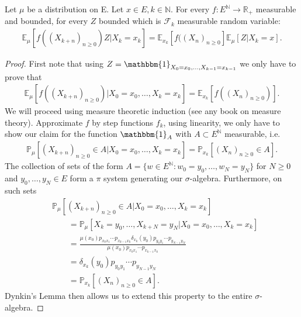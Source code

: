 \begin{theorem}
	Let $\mu$ be a distribution on E. Let $x \in E, k \in \mathbb{N}$. For every $f: E^{\mathbb{N}} \to \mathbb{R}_+$ measurable and bounded, for every $Z$ bounded which is $ \mathcal{F}_k$ measurable random variable:
\begin{align}
	\boxed{	\mathbb{E}_\mu \left[ f((X_{k+n})_{n \geq 0})Z | X_k = x_k \right] = \mathbb{E}_{x_k} \left[ f((X_n)_{n \geq 0} \right] \mathbb{E}_\mu \left[ Z | X_k=x \right] }. 
\end{align}
\end{theorem}
\begin{proof}
	First note that using $Z= \mathbbm{1}_{X_0=x_0, \ldots ,X_{k-1}=x_{k-1}}$ we only have to prove that 
\begin{align}
	\mathbb{E}_{\mu } \left[ f((X_{k+n})_{n\geq 0}) | X_0=x_0 , \ldots , X_k=x_k \right]= \mathbb{E}_{x_k} \left[ f((X_n)_{n\geq 0}) \right]
.\end{align}
	 We will proceed using measure theoretic induction (see any book on measure theory). Approximate $f$ by step functions $f_k$, using linearity, we only have to show our claim for the function $\mathbbm{1}_{A} $ with $A \subset E ^{\mathbb{N}}$ measurable, i.e. 
	\begin{align}
	\mathbb{P}_{\mu } \left[ (X_{k+n})_{n\geq 0}\in A | X_0=x_0, \ldots ,X_k=x_k \right] = \mathbb{P}_{x_k} \left[ (X_n)_{n\geq 0} \in A \right] 
.\end{align}  
The collection of sets of the form $A=\{w \in E^{\mathbb{N}}: w_0=y_0, \ldots ,w_N=y_N\}$ for $N\geq 0$ and $y_0, \ldots ,y_N \in E$ form a $\pi $ system generating our $\sigma$-algebra. Furthermore, on such sets 
\begin{align}
&	\mathbb{P}_{\mu } \left[ (X_{k+n})_{n\geq 0}\in A | X_0 = x_0, \ldots ,X_k=x_k \right] \\
&\qquad= \mathbb{P}_{\mu} \left[ X_k=y_0, \ldots ,X_{k+N}= y_N | X_0=x_0, \ldots ,X_k=x_k  \right] \\
&\qquad= \frac{\mu (x_0) p_{x_0x_1} \cdots p_{x_{k-1}x_k} \delta_{x_k}(y_0)p_{y_0y_1} \cdots p_{y_{N-1}y_N}}{\mu (x_0) p_{x_0x_1} \cdots p_{x_{k-1}x_k} } \\
& \qquad= \delta_{x_k}(y_0)p_{y_0y_1} \cdots p_{y_{N-1}y_N} \\
& \qquad= \mathbb{P}_{x_k} \left[ (X_n)_{n\geq 0} \in A \right] 
.\end{align}
Dynkin's Lemma then allows us to extend this property to the entire $\sigma$-algebra.
\end{proof}


